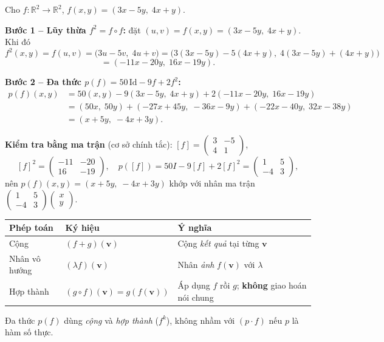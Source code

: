 \documentclass[12pt,a4paper]{article}
\begin{document}
\begin{vidu}[title={Tính $f^2$ và $p(f)$ với $p(t) = 50 - 9t + 2t^2$}]
Cho $f: \mathbb{R}^2 \to \mathbb{R}^2$, $f(x, y) = (3x - 5y,\; 4x + y)$.

\textbf{Bước 1 -- Lũy thừa $f^2 = f \circ f$:} đặt $(u, v) = f(x,y) = (3x - 5y,\; 4x + y)$. Khi đó
\[
  f^2(x,y) = f(u,v) = \bigl(3u - 5v,\; 4u + v\bigr)
  = \bigl(3(3x-5y) - 5(4x+y),\; 4(3x-5y) + (4x+y)\bigr)
\]
\[
  = \boxed{(-11x - 20y,\; 16x - 19y)}.
\]

\textbf{Bước 2 -- Đa thức $p(f) = 50\,\mathrm{Id} - 9f + 2f^2$:}
\begin{align*}
  p(f)(x,y)
  &= 50(x,y) - 9(3x-5y,\; 4x+y) + 2(-11x-20y,\; 16x-19y)\\
  &= (50x,\; 50y) + (-27x+45y,\; -36x-9y) + (-22x-40y,\; 32x-38y)\\
  &= \boxed{(x + 5y,\; -4x + 3y)}.
\end{align*}

\textbf{Kiểm tra bằng ma trận} (cơ sở chính tắc): $[f] = \begin{pmatrix}3 & -5\\ 4 & 1\end{pmatrix}$,
\[
  [f]^2 = \begin{pmatrix}-11 & -20\\ 16 & -19\end{pmatrix},\quad
  p([f]) = 50I - 9[f] + 2[f]^2 = \begin{pmatrix}1 & 5\\ -4 & 3\end{pmatrix},
\]
nên $p(f)(x,y) = (x + 5y,\; -4x + 3y)$ khớp với nhân ma trận $\begin{pmatrix}1 & 5\\ -4 & 3\end{pmatrix}\begin{pmatrix}x\\ y\end{pmatrix}$.
\end{vidu}

\begin{luuy}[title={Phân biệt ba phép toán trên $\mathrm{End}(V)$}]
\begin{center}
\begin{tabular}{lll}
\toprule
Phép toán & Ký hiệu & Ý nghĩa \\
\midrule
Cộng & $(f+g)(\mathbf{v})$ & Cộng \emph{kết quả} tại từng $\mathbf{v}$ \\
Nhân vô hướng & $(\lambda f)(\mathbf{v})$ & Nhân \emph{ảnh} $f(\mathbf{v})$ với $\lambda$ \\
Hợp thành & $(g \circ f)(\mathbf{v}) = g(f(\mathbf{v}))$ & Áp dụng $f$ rồi $g$; \textbf{không} giao hoán nói chung \\
\bottomrule
\end{tabular}
\end{center}
Đa thức $p(f)$ dùng \emph{cộng} và \emph{hợp thành} ($f^k$), không nhầm với $(p \cdot f)$ nếu $p$ là hàm số thực.
\end{luuy}
\end{document}
